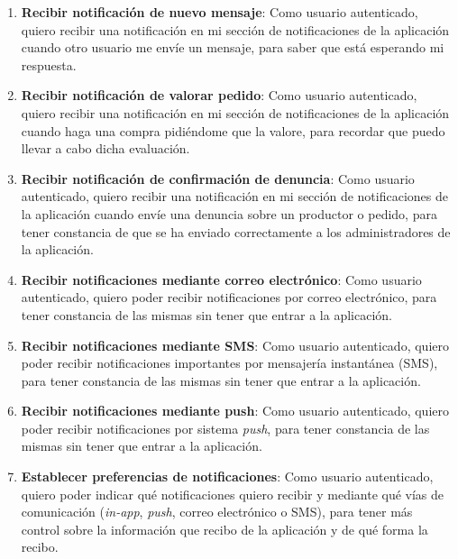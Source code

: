 \begin{enumerate}[label=HU-\protect\twodigits{\arabic*}:, align=left, leftmargin=*]
\item \textbf{Recibir notificación de nuevo mensaje}: Como usuario autenticado, quiero recibir una notificación en mi sección de notificaciones de la aplicación cuando otro usuario me envíe un mensaje, para saber que está esperando mi respuesta.

\item \textbf{Recibir notificación de valorar pedido}: Como usuario autenticado, quiero recibir una notificación en mi sección de notificaciones de la aplicación cuando haga una compra pidiéndome que la valore, para recordar que puedo llevar a cabo dicha evaluación.

\item \textbf{Recibir notificación de confirmación de denuncia}: Como usuario autenticado, quiero recibir una notificación en mi sección de notificaciones de la aplicación cuando envíe una denuncia sobre un productor o pedido, para tener constancia de que se ha enviado correctamente a los administradores de la aplicación.

\item \textbf{Recibir notificaciones mediante correo electrónico}: Como usuario autenticado, quiero poder recibir notificaciones por correo electrónico, para tener constancia de las mismas sin tener que entrar a la aplicación.

\item \textbf{Recibir notificaciones mediante SMS}: Como usuario autenticado, quiero poder recibir notificaciones importantes por mensajería instantánea (SMS), para tener constancia de las mismas sin tener que entrar a la aplicación.

\item \textbf{Recibir notificaciones mediante push}: Como usuario autenticado, quiero poder recibir notificaciones por sistema \textit{push}, para tener constancia de las mismas sin tener que entrar a la aplicación.

\item \textbf{Establecer preferencias de notificaciones}: Como usuario autenticado, quiero poder indicar qué notificaciones quiero recibir y mediante qué vías de comunicación (\textit{in-app}, \textit{push}, correo electrónico o SMS), para tener más control sobre la información que recibo de la aplicación y de qué forma la recibo.



\end{enumerate}
